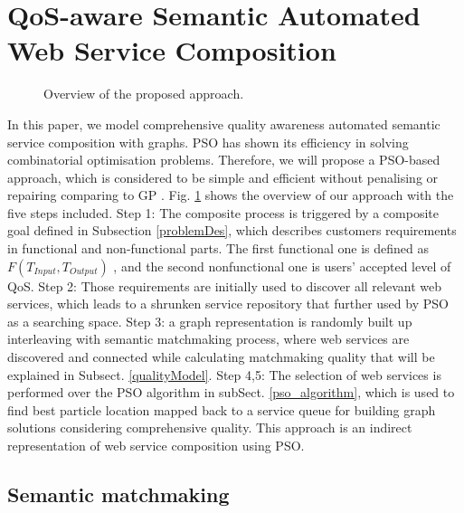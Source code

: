 \documentclass{llncs}
\begin{document}
\section{QoS-aware Semantic Automated Web Service Composition}\label{qswsc_approach}
\begin{figure}[h]
\centerline{
}
 \caption{Overview of the proposed approach.}
 \label{overview}
\end{figure}
In this paper, we model comprehensive quality awareness automated semantic service composition with graphs. PSO has shown its efficiency in solving combinatorial optimisation problems. Therefore, we will propose a PSO-based approach, which is considered to be simple and efficient without penalising or repairing comparing to GP \cite{da2014graph}. Fig. \ref{overview} shows the overview of our approach with the five steps included. Step 1: The composite process is triggered by a composite goal defined in Subsection \ref{problemDes}, which describes customers requirements in functional and non-functional parts. The first functional one is defined as $F(T_{Input}, T_{Output})$ , and the second nonfunctional one is users' accepted level of QoS. Step 2: Those requirements are initially used to discover all relevant web services, which leads to a shrunken service repository that further used by PSO as a searching space. Step 3: a graph representation is randomly built up interleaving with semantic matchmaking process, where web services are discovered and connected while calculating matchmaking quality that will be explained in Subsect. \ref{qualityModel}. Step 4,5: The selection of web services is performed over the PSO algorithm in subSect. \ref{pso_algorithm}, which is used to find best particle location mapped back to a service queue for building graph solutions considering comprehensive quality. This approach \cite{da2016particle} is an indirect representation of web service composition using PSO.
\subsection{Semantic matchmaking}
\end{document}
